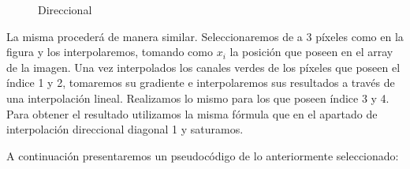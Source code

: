 \documentclass[10pt, a4paper]{article}
\begin{document}
\begin{figure}[H]
\centering
	\caption{Direccional} 
\end{figure}

La misma proceder\'a de manera similar. Seleccionaremos de a 3 p\'ixeles como en la figura y los interpolaremos, tomando como $x_{i}$ la posici\'on que poseen en el array de la imagen. Una vez interpolados los canales verdes de los p\'ixeles que poseen el \'indice 1 y 2, tomaremos su gradiente e interpolaremos sus resultados a trav\'es de una interpolaci\'on lineal. Realizamos lo mismo para los que poseen \'indice 3 y 4. Para obtener el resultado utilizamos la misma f\'ormula que en el apartado de interpolaci\'on direccional diagonal 1 y saturamos. 

A continuaci\'on presentaremos un pseudoc\'odigo de lo anteriormente seleccionado:
\end{document}
